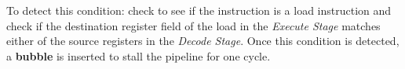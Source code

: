 \documentclass[12pt]{article}
\newenvironment{QandA}{\begin{enumerate}[label=\bfseries\alph*.]\bfseries}
                      {\end{enumerate}}
\newenvironment{answered}{\par\quad\normalfont}{}
\begin{document}
\begin{QandA}
\begin{answered}
   To detect this condition: check to see if the instruction is a load instruction and check if the destination register field of the load in the \textit{Execute Stage} matches either of the source registers in the \textit{Decode Stage}. Once this condition is detected, a \textbf{bubble} is inserted to stall the pipeline for one cycle. 
   \end{answered}
   
   
\end{QandA}
\end{document}
